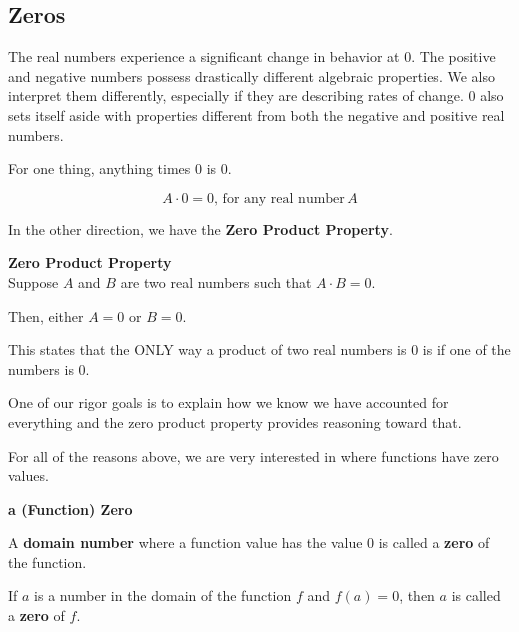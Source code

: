 \documentclass{ximera}
\begin{document}
\subsection*{Zeros}

The real numbers experience a significant change in behavior at $0$.  The positive and negative numbers possess drastically different algebraic properties. We also interpret them differently, especially if they are describing rates of change.  $0$ also sets itself aside with properties different from both the negative and positive real numbers. 


For one thing, anything times $0$ is $0$.


\[
A \cdot 0 = 0, \, \text{for any real number} \, A
\]

In the other direction, we have the \textbf{\textcolor{purple!85!blue}{Zero Product Property}}.  








\begin{definition}  \textbf{\textcolor{green!50!black}{Zero Product Property}} \\


Suppose $A$ and $B$ are two real numbers such that $A \cdot B = 0$. 


Then, either $A = 0$ or $B = 0$.




\end{definition}





This states that the ONLY way a product of two real numbers is $0$ is if one of the numbers is $0$.  

One of our rigor goals is to explain how we know we have accounted for everything and the zero product property provides reasoning toward that.

For all of the reasons above, we are very interested in where functions have zero values.






\begin{definition}  \textbf{\textcolor{green!50!black}{a (Function) Zero}} 


A \textbf{domain number} where a function value has the value $0$ is called a \textbf{zero} of the function.


\begin{center}
If $a$ is a number in the domain of the function $f$ and $f(a) = 0$, then $a$ is called a \textbf{zero} of $f$.
\end{center}


\end{definition}
\end{document}
